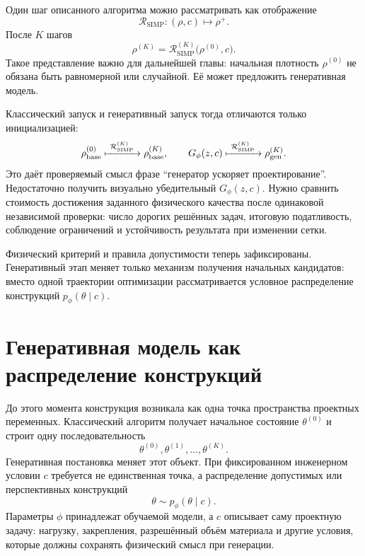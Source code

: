 Один шаг описанного алгоритма можно рассматривать как отображение
\begin{equation}
\label{eq:simp-refinement-map}
 \mathcal R_{\mathrm{SIMP}}
 :
 (\rho,c)
 \longmapsto
 \rho^+.
\end{equation}
После $K$ шагов
\begin{equation}
 \rho^{(K)}
 =
 \mathcal R_{\mathrm{SIMP}}^{(K)}
 \bigl(\rho^{(0)},c\bigr).
\end{equation}
Такое представление важно для дальнейшей главы: начальная плотность $\rho^{(0)}$ не обязана быть равномерной или случайной. Её может предложить генеративная модель.

Классический запуск и генеративный запуск тогда отличаются только инициализацией:
\begin{equation}
 \rho_{\mathrm{base}}^{(0)}
 \xmapsto{\ \mathcal R_{\mathrm{SIMP}}^{(K)}\ }
 \rho_{\mathrm{base}}^{(K)},
 \qquad
 G_\phi(z,c)
 \xmapsto{\ \mathcal R_{\mathrm{SIMP}}^{(K)}\ }
 \rho_{\mathrm{gen}}^{(K)}.
\end{equation}
Это даёт проверяемый смысл фразе ``генератор ускоряет проектирование''. Недостаточно получить визуально убедительный $G_\phi(z,c)$. Нужно сравнить стоимость достижения заданного физического качества после одинаковой независимой проверки: число дорогих решённых задач, итоговую податливость, соблюдение ограничений и устойчивость результата при изменении сетки.

Физический критерий и правила допустимости теперь зафиксированы. Генеративный этап меняет только механизм получения начальных кандидатов: вместо одной траектории оптимизации рассматривается условное распределение конструкций $p_\phi(\theta\mid c)$.

\section{Генеративная модель как распределение конструкций}

До этого момента конструкция возникала как одна точка пространства проектных переменных. Классический алгоритм получает начальное состояние $\theta^{(0)}$ и строит одну последовательность
\begin{equation}
 \theta^{(0)},\theta^{(1)},\ldots,\theta^{(K)}.
\end{equation}
Генеративная постановка меняет этот объект. При фиксированном инженерном условии $c$ требуется не единственная точка, а распределение допустимых или перспективных конструкций
\begin{equation}
\label{eq:conditional-design-distribution}
 \theta\sim p_\phi(\theta\mid c).
\end{equation}
Параметры $\phi$ принадлежат обучаемой модели, а $c$ описывает саму проектную задачу: нагрузку, закрепления, разрешённый объём материала и другие условия, которые должны сохранять физический смысл при генерации.

